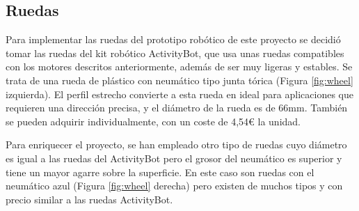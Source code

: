 \setcounter{footnote}{41} %



\subsection{Ruedas}

Para implementar las ruedas del prototipo robótico de este proyecto se decidió tomar las ruedas del kit robótico ActivityBot, que usa unas ruedas compatibles con los motores descritos anteriormente, además de ser muy ligeras y estables. Se trata de una rueda de plástico con neumático tipo junta tórica (Figura \ref{fig:wheel} izquierda). El perfil estrecho convierte a esta rueda en ideal para aplicaciones que requieren una dirección precisa, y el diámetro de la rueda es de 66mm. También se pueden adquirir individualmente, con un coste de 4,54€ la unidad.

Para enriquecer el proyecto, se han empleado otro tipo de ruedas cuyo diámetro es igual a las ruedas del ActivityBot pero el grosor del neumático es superior y tiene un mayor agarre sobre la superficie. En este caso son ruedas con el neumático azul (Figura \ref{fig:wheel} derecha) pero existen de muchos tipos y con precio similar a las ruedas ActivityBot.


